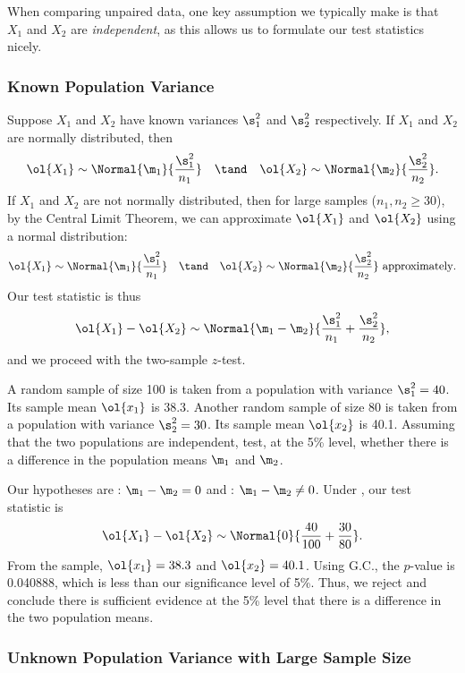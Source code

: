 When comparing unpaired data, one key assumption we typically make is that $X_1$ and $X_2$ are \emph{independent}, as this allows us to formulate our test statistics nicely. 

\subsubsection{Known Population Variance}

Suppose $X_1$ and $X_2$ have known variances $\s_1^2$ and $\s_2^2$ respectively. If $X_1$ and $X_2$ are normally distributed, then \[\ol{X_1} \sim \Normal{\m_1}{\frac{\s_1^2}{n_1}} \quad \tand \quad \ol{X_2} \sim \Normal{\m_2}{\frac{\s_2^2}{n_2}}.\] If $X_1$ and $X_2$ are not normally distributed, then for large samples ($n_1, n_2 \geq 30$), by the Central Limit Theorem, we can approximate $\ol{X_1}$ and $\ol{X_2}$ using a normal distribution: \[\ol{X_1} \sim \Normal{\m_1}{\frac{\s_1^2}{n_1}} \quad \tand \quad \ol{X_2} \sim \Normal{\m_2}{\frac{\s_2^2}{n_2}} \text{ approximately}.\] Our test statistic is thus \[\ol{X_1} - \ol{X_2} \sim \Normal{\m_1 - \m_2}{\frac{\s_1^2}{n_1} + \frac{\s_2^2}{n_2}},\] and we proceed with the two-sample $z$-test.

\begin{sample}
    A random sample of size 100 is taken from a population with variance $\s_1^2 = 40$. Its sample mean $\ol{x_1}$ is 38.3. Another random sample of size 80 is taken from a population with variance $\s_2^2 = 30$. Its sample mean $\ol{x_2}$ is 40.1. Assuming that the two populations are independent, test, at the 5\% level, whether there is a difference in the population means $\m_1$ and $\m_2$.
\end{sample}
\begin{sampans}
    Our hypotheses are \nullhyp: $\m_1 - \m_2 = 0$ and \althyp: $\m_1 - \m_2 \neq 0$. Under \nullhyp, our test statistic is \[\ol{X_1} - \ol{X_2} \sim \Normal{0}{\frac{40}{100} + \frac{30}{80}}.\] From the sample, $\ol{x_1} = 38.3$ and $\ol{x_2} = 40.1$. Using G.C., the $p$-value is 0.040888, which is less than our significance level of 5\%. Thus, we reject \nullhyp{} and conclude there is sufficient evidence at the 5\% level that there is a difference in the two population means.
\end{sampans}

\subsubsection{Unknown Population Variance with Large Sample Size}


